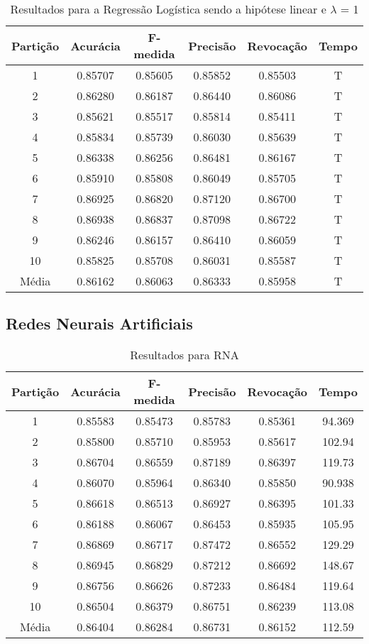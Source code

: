 \begin{table}[h]
\centering
\caption{Resultados para a Regressão Logística sendo a hipótese linear e \(\lambda\) = 1}
\vspace{0.2cm}
\begin{tabular}{c|c|c|c|c|c}
Partição & Acurácia & F-medida & Precisão & Revocação & Tempo \\
\hline
1  & 0.85707 & 0.85605 & 0.85852 & 0.85503 & T \\      
2  & 0.86280 & 0.86187 & 0.86440 & 0.86086 & T \\      
3  & 0.85621 & 0.85517 & 0.85814 & 0.85411 & T \\      
4  & 0.85834 & 0.85739 & 0.86030 & 0.85639 & T \\      
5  & 0.86338 & 0.86256 & 0.86481 & 0.86167 & T \\      
6  & 0.85910 & 0.85808 & 0.86049 & 0.85705 & T \\      
7  & 0.86925 & 0.86820 & 0.87120 & 0.86700 & T \\    
8  & 0.86938 & 0.86837 & 0.87098 & 0.86722 & T \\      
9  & 0.86246 & 0.86157 & 0.86410 & 0.86059 & T \\      
10 & 0.85825 & 0.85708 & 0.86031 & 0.85587 & T \\
\hline
Média & 0.86162 & 0.86063 & 0.86333 & 0.85958 & T 

\end{tabular} 
\label{table:resultadosRL}
\end{table}

\subsection{Redes Neurais Artificiais}
\begin{table}[h]
\centering
\caption{Resultados para RNA}
\vspace{0.2cm}
\begin{tabular}{c|c|c|c|c|c}
Partição & Acurácia & F-medida & Precisão & Revocação & Tempo \\
\hline
1  & 0.85583 & 0.85473 & 0.85783 & 0.85361 & 94.369 \\
2  & 0.85800 & 0.85710 & 0.85953 & 0.85617 & 102.94 \\
3  & 0.86704 & 0.86559 & 0.87189 & 0.86397 & 119.73 \\
4  & 0.86070 & 0.85964 & 0.86340 & 0.85850 & 90.938 \\
5  & 0.86618 & 0.86513 & 0.86927 & 0.86395 & 101.33 \\
6  & 0.86188 & 0.86067 & 0.86453 & 0.85935 & 105.95 \\
7  & 0.86869 & 0.86717 & 0.87472 & 0.86552 & 129.29 \\
8  & 0.86945 & 0.86829 & 0.87212 & 0.86692 & 148.67 \\
9  & 0.86756 & 0.86626 & 0.87233 & 0.86484 & 119.64 \\
10 & 0.86504 & 0.86379 & 0.86751 & 0.86239 & 113.08 \\
\hline
Média & 0.86404 & 0.86284 & 0.86731 & 0.86152 & 112.59 \\
\end{tabular} 
\label{table:resultadosSVMLinear}
\end{table}


